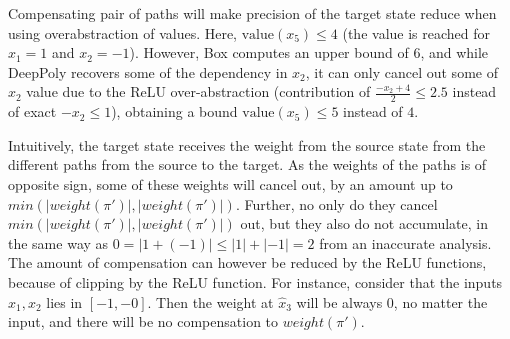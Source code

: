 \documentclass{llncs}
\newcommand{\Val}{{\textrm{value}}}
\newcommand{\ReLU}{\mathrm{ReLU}}
\begin{document}
Compensating pair of paths will make precision of the target state reduce when using overabstraction of values. Here, $\Val(x_5) \leq 4$ (the value is reached for $x_1=1$ and $x_2=-1$). However, Box computes an upper bound of $6$, and while DeepPoly recovers some of the dependency in $x_2$, it can only cancel out some of $x_2$ value due to the ReLU over-abstraction (contribution of $\frac{-x_2+4}{2} \leq 2.5$ instead of exact $-x_2 \leq 1$), obtaining a bound $\Val(x_5) \leq 5$ instead of $4$.

Intuitively, the target state receives the weight from the source state from the different paths from the source to the target. As the weights of the paths is of opposite sign, some of these weights will cancel out, by an amount up to $min(|weight(\pi')|,|weight(\pi')|)$. Further, no only do they cancel $min(|weight(\pi')|,|weight(\pi')|)$ out, but they also do not accumulate, in the same way as $0= |1+(-1)| \leq |1|+|-1|=2$ from an inaccurate analysis. The amount of compensation can however be reduced by the ReLU functions, because of clipping by the ReLU function. For instance, consider that the inputs $x_1,x_2$ lies in $[-1,-0]$. Then the weight at $\hat{x}_3$ will be always 0, no matter the input, and there will be no compensation to $weight(\pi')$.




\iffalse
\vspace*{2ex}

\begin{figure}
\centering
{}
\end{figure}
\end{document}
